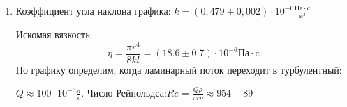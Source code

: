 \documentclass[a4paper, 12pt]{article}%
\begin{document}
\begin{enumerate}
\begin{figure}[H]
	\caption{}
\end{figure}


\item Коэффициент угла наклона графика: $k = (0,479 \pm 0,002)\cdot 10^{-6} \frac{\text{Па} \cdot c}{\text{м}^3}$

Искомая вязкость:
\[
\eta = \frac{\pi r^4 }{8 k l} = (18.6 \pm 0.7) \cdot 10^{-6} \text{Па} \cdot \text{c}
\]
По графику определим, когда ламинарный поток переходит в турбулентный:

 $Q \approx 100 \cdot 10^{-3} \frac{\text{л}}{c}$.
  Число Рейнольдса:$Re = \frac{Q \rho}{\pi r \eta} \approx 954 \pm 89$




\end{enumerate}
\end{document}
